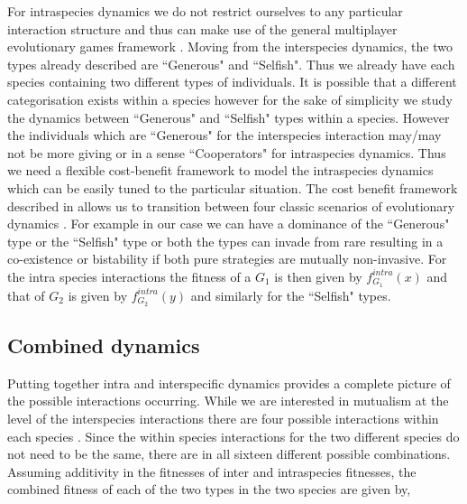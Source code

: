 \documentclass{pnastwo}
\begin{document}
\begin{article}
For intraspecies dynamics we do not restrict ourselves to any particular interaction structure and thus can make use of the general multiplayer evolutionary games framework \cite{gokhale:PNAS:2010,gokhale:DGAA:2014}.
Moving from the interspecies dynamics, the two types already described are ``Generous" and ``Selfish".
Thus we already have each species containing two different types of individuals.
It is possible that a different categorisation exists within a species however for the sake of simplicity we study the dynamics between ``Generous" and ``Selfish" types within a species.
However the individuals which are ``Generous" for the interspecies interaction may/may not be more giving or in a sense ``Cooperators" for intraspecies dynamics.
Thus we need a flexible cost-benefit framework to model the intraspecies dynamics which can be easily tuned to the particular situation.
The cost benefit framework described in \cite{eshel:AmNat:1988,hauert:JTB:2006a}
 allows us to transition between four classic scenarios of evolutionary dynamics \cite{nowak:Science:2004}.
For example in our case we can have a dominance of the ``Generous" type or the ``Selfish" type or both the types can invade from rare resulting in a co-existence or bistability if both pure strategies are mutually non-invasive.
For the intra species interactions the fitness of a $G_1$ is then given by $f^{intra}_{G_1} (x)$ and that of $G_2$ is given by $f^{intra}_{G_2} (y)$ and similarly for the ``Selfish" types.

\subsection{Combined dynamics}

Putting together intra and interspecific dynamics provides a complete picture of the possible interactions occurring. While we are interested in mutualism at the level of the interspecies interactions there are four possible interactions within each species \cite{nowak:Science:2004,hauert:JTB:2006a}. Since the within species interactions for the two different species do not need to be the same, there are in all sixteen different possible combinations.
Assuming additivity in the fitnesses of inter and intraspecies fitnesses, the combined fitness of each of the two types in the two species are given by,


\end{article}
\end{document}

